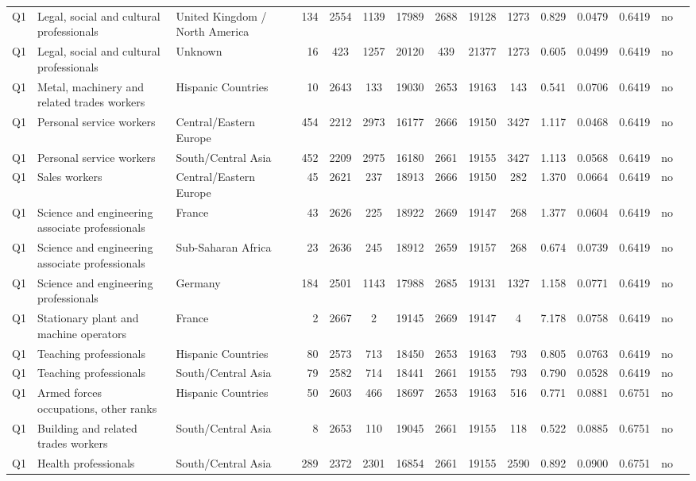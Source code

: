 \begin{longtable}{lllrcccccccccll}
Q1 & Legal, social and cultural professionals & United Kingdom / North America & 134 & 2554 & 1139 & 17989 & 2688 & 19128 & 1273 & 0.829 & 0.0479 & 0.6419 & no \\
Q1 & Legal, social and cultural professionals & Unknown & 16 & 423 & 1257 & 20120 & 439 & 21377 & 1273 & 0.605 & 0.0499 & 0.6419 & no \\
Q1 & Metal, machinery and related trades workers & Hispanic Countries & 10 & 2643 & 133 & 19030 & 2653 & 19163 & 143 & 0.541 & 0.0706 & 0.6419 & no \\
Q1 & Personal service workers & Central/Eastern Europe & 454 & 2212 & 2973 & 16177 & 2666 & 19150 & 3427 & 1.117 & 0.0468 & 0.6419 & no \\
Q1 & Personal service workers & South/Central Asia & 452 & 2209 & 2975 & 16180 & 2661 & 19155 & 3427 & 1.113 & 0.0568 & 0.6419 & no \\
Q1 & Sales workers & Central/Eastern Europe & 45 & 2621 & 237 & 18913 & 2666 & 19150 & 282 & 1.370 & 0.0664 & 0.6419 & no \\
Q1 & Science and engineering associate professionals & France & 43 & 2626 & 225 & 18922 & 2669 & 19147 & 268 & 1.377 & 0.0604 & 0.6419 & no \\
Q1 & Science and engineering associate professionals & Sub-Saharan Africa & 23 & 2636 & 245 & 18912 & 2659 & 19157 & 268 & 0.674 & 0.0739 & 0.6419 & no \\
Q1 & Science and engineering professionals & Germany & 184 & 2501 & 1143 & 17988 & 2685 & 19131 & 1327 & 1.158 & 0.0771 & 0.6419 & no \\
Q1 & Stationary plant and machine operators & France & 2 & 2667 & 2 & 19145 & 2669 & 19147 & 4 & 7.178 & 0.0758 & 0.6419 & no \\
Q1 & Teaching professionals & Hispanic Countries & 80 & 2573 & 713 & 18450 & 2653 & 19163 & 793 & 0.805 & 0.0763 & 0.6419 & no \\
Q1 & Teaching professionals & South/Central Asia & 79 & 2582 & 714 & 18441 & 2661 & 19155 & 793 & 0.790 & 0.0528 & 0.6419 & no \\
Q1 & Armed forces occupations, other ranks & Hispanic Countries & 50 & 2603 & 466 & 18697 & 2653 & 19163 & 516 & 0.771 & 0.0881 & 0.6751 & no \\
Q1 & Building and related trades workers & South/Central Asia & 8 & 2653 & 110 & 19045 & 2661 & 19155 & 118 & 0.522 & 0.0885 & 0.6751 & no \\
Q1 & Health professionals & South/Central Asia & 289 & 2372 & 2301 & 16854 & 2661 & 19155 & 2590 & 0.892 & 0.0900 & 0.6751 & no \\

\end{longtable}
